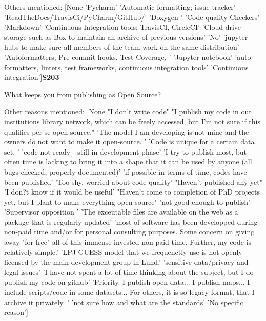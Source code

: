 Others mentioned: [None 'Pycharm' 'Automatic formatting; issue tracker'
 'ReadTheDocs/TravisCi/PyCharm/GitHub/' 'Doxygen ' 'Code quality Checkers'
 'Markdown' 'Continuous Integration tools: TravisCI, CircleCI'
 'Cloud drive storage such as Box to maintain an archive of previous versions'
 'No'
 'jupyter hubs to make sure all members of the team work on the same distribution'
 'Autoformatters, Pre-commit hooks, Test Coverage, ' 'Jupyter notebook'
 'auto-formatters, linters, test frameworks, continuous integration tools'
 'Continuous integration']\textbf{S203}

What keeps you from publishing as Open Source?

Other reasons mentioned: [None "I don't write code"
 "I publish my code in out institutions library network, which can be freely accessed, but I'm not sure if this qualifies per se open source."
 'The model I am developing is not mine and the owners do not want to make it open-source. '
 'Code is unique for a certain data set. '
 'code not ready - still in development phase'
 'I try to publish most, but often time is lacking to bring it into a shape that it can be used by anyone (all bugs checked, properly documented)'
 'if possible in terms of time, codes have been published'
 'Too shy, worried about code quality' "Haven't published any yet"
 'I don?t know if it would be useful'
 "Haven't come to completion of PhD projects yet, but I plant to make everything open source"
 'not good enough to publish' 'Supervisor opposition '
 'The exceutable files are available on the web as a package that is regularly updated'
 'most of software has been developped during non-paid time and/or for personal consulting purposes. Some concern on giving away "for free" all of this immense invested non-paid time. Further, my code is relatively simple.'
 'LPJ-GUESS model that we frequenctly use is not openly licensed by the main development group in Lund.'
 'sensitive data/privacy and legal issues'
 'I have not spent a lot of time thinking about the subject, but I do publish my code on github'
 'Priority. I publish open data... I publish maps... I include scripts/code in some datasets... For others, it is so legacy format, that I archive it privately. '
 'not sure how and what are the standards' 'No specific reason']

